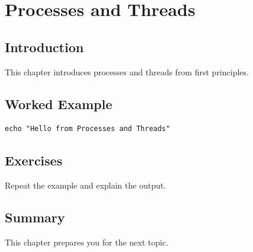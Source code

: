\chapter{Processes and Threads}
\label{chap:32}
\section{Introduction}
This chapter introduces processes and threads from first principles.

\section{Worked Example}
\begin{lstlisting}
echo "Hello from Processes and Threads"
\end{lstlisting}

\section{Exercises}
\begin{exercise}
Repeat the example and explain the output.
\end{exercise}

\section{Summary}
This chapter prepares you for the next topic.
